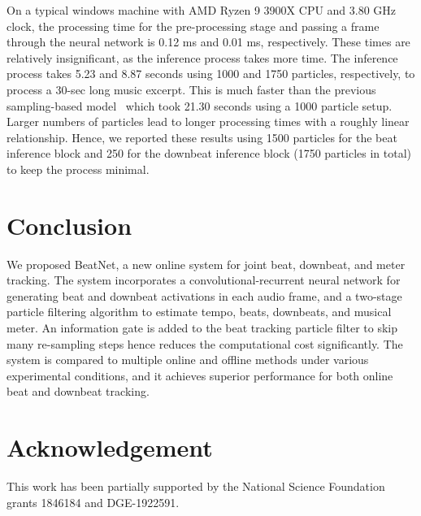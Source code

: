 \documentclass{article}
\begin{document}
On a typical windows machine with AMD Ryzen 9 3900X CPU and 3.80 GHz clock, the processing time for the pre-processing stage and passing a frame through the neural network is 0.12 ms and 0.01 ms, respectively. These times are relatively insignificant, as the inference process takes more time. The inference process takes 5.23 and 8.87 seconds using 1000 and 1750 particles, respectively, to process a 30-sec long music excerpt. This is much faster than the previous sampling-based model~\cite{Heydari} which took 21.30 seconds using a 1000 particle setup. Larger numbers of particles lead to longer processing times with a roughly linear relationship. Hence, we reported these results using 1500 particles for the beat inference block and 250 for the downbeat inference block (1750 particles in total) to keep the process minimal.

\section{Conclusion}
We proposed BeatNet, a new online system for joint beat, downbeat, and meter tracking. The system incorporates a convolutional-recurrent neural network for generating beat and downbeat activations in each audio frame, and a two-stage particle filtering algorithm to estimate tempo, beats, downbeats, and musical meter. An information gate is added to the beat tracking particle filter to skip many re-sampling steps hence reduces the computational cost significantly. The system is compared to multiple online and offline  methods under various experimental conditions, and it achieves superior performance for both online beat and downbeat tracking.

\section{Acknowledgement}
This work has been partially supported by the National Science Foundation grants 1846184 and DGE-1922591.




\end{document}
